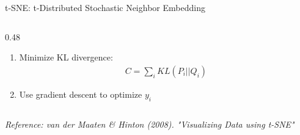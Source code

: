 \documentclass[aspectratio=169]{beamer}
\begin{document}
\begin{frame}[shrink=10]{t-SNE: t-Distributed Stochastic Neighbor Embedding 🎨}
\begin{columns}[T]
\begin{column}{0.48\textwidth}
\begin{enumerate}
    \item Minimize KL divergence:
    \begin{align*}
    C = \sum_i KL(P_i || Q_i)
    \end{align*}

    \item Use gradient descent to optimize $y_i$
\end{enumerate}
\end{column}
\end{columns}

\vspace{0.5em}
\small
\textit{Reference: van der Maaten \& Hinton (2008). "Visualizing Data using t-SNE"}
\end{frame}

\end{document}
